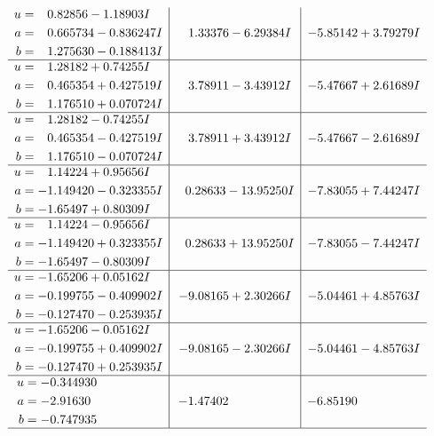 \documentclass[1p]{elsarticle_modified}
\theoremstyle{definition}
\begin{document}
$$\begin{array}{c|c|c}
\begin{aligned}
u &= \phantom{-}0.82856 - 1.18903 I \\
a &= \phantom{-}0.665734 - 0.836247 I \\
b &= \phantom{-}1.275630 - 0.188413 I\end{aligned}
 & \phantom{-}1.33376 - 6.29384 I & -5.85142 + 3.79279 I \\ \hline\begin{aligned}
u &= \phantom{-}1.28182 + 0.74255 I \\
a &= \phantom{-}0.465354 + 0.427519 I \\
b &= \phantom{-}1.176510 + 0.070724 I\end{aligned}
 & \phantom{-}3.78911 - 3.43912 I & -5.47667 + 2.61689 I \\ \hline\begin{aligned}
u &= \phantom{-}1.28182 - 0.74255 I \\
a &= \phantom{-}0.465354 - 0.427519 I \\
b &= \phantom{-}1.176510 - 0.070724 I\end{aligned}
 & \phantom{-}3.78911 + 3.43912 I & -5.47667 - 2.61689 I \\ \hline\begin{aligned}
u &= \phantom{-}1.14224 + 0.95656 I \\
a &= -1.149420 - 0.323355 I \\
b &= -1.65497 + 0.80309 I\end{aligned}
 & \phantom{-}0.28633 - 13.95250 I & -7.83055 + 7.44247 I \\ \hline\begin{aligned}
u &= \phantom{-}1.14224 - 0.95656 I \\
a &= -1.149420 + 0.323355 I \\
b &= -1.65497 - 0.80309 I\end{aligned}
 & \phantom{-}0.28633 + 13.95250 I & -7.83055 - 7.44247 I \\ \hline\begin{aligned}
u &= -1.65206 + 0.05162 I \\
a &= -0.199755 - 0.409902 I \\
b &= -0.127470 - 0.253935 I\end{aligned}
 & -9.08165 + 2.30266 I & -5.04461 + 4.85763 I \\ \hline\begin{aligned}
u &= -1.65206 - 0.05162 I \\
a &= -0.199755 + 0.409902 I \\
b &= -0.127470 + 0.253935 I\end{aligned}
 & -9.08165 - 2.30266 I & -5.04461 - 4.85763 I \\ \hline\begin{aligned}
u &= -0.344930\phantom{ +0.000000I} \\
a &= -2.91630\phantom{ +0.000000I} \\
b &= -0.747935\phantom{ +0.000000I}\end{aligned}
 & -1.47402\phantom{ +0.000000I} & -6.85190\phantom{ +0.000000I}\\
 \hline 
 \end{array}$$\newpage\newpage\renewcommand{\arraystretch}{1}
\end{document}
